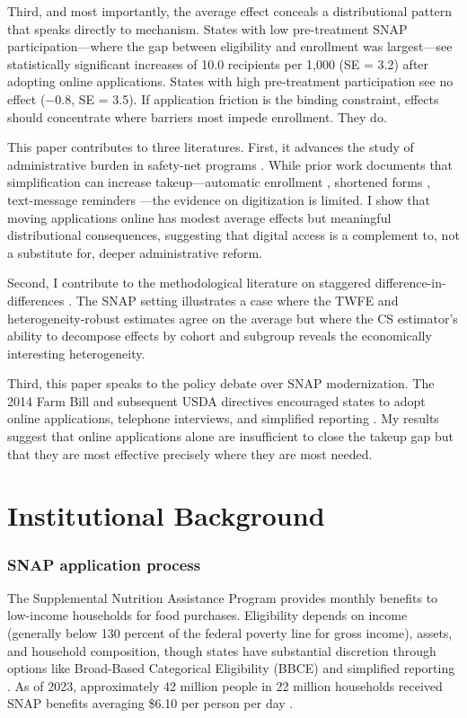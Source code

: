 \documentclass[12pt]{article}
\begin{document}
Third, and most importantly, the average effect conceals a distributional pattern that speaks directly to mechanism. States with low pre-treatment SNAP participation---where the gap between eligibility and enrollment was largest---see statistically significant increases of 10.0 recipients per 1,000 (SE = 3.2) after adopting online applications. States with high pre-treatment participation see no effect ($-0.8$, SE = 3.5). If application friction is the binding constraint, effects should concentrate where barriers most impede enrollment. They do.

This paper contributes to three literatures. First, it advances the study of administrative burden in safety-net programs \citep{herd2023, fox2022}. While prior work documents that simplification can increase takeup---automatic enrollment \citep{finkelstein2019}, shortened forms \citep{bhargava2015}, text-message reminders \citep{finkelstein2019}---the evidence on digitization is limited. I show that moving applications online has modest average effects but meaningful distributional consequences, suggesting that digital access is a complement to, not a substitute for, deeper administrative reform.

Second, I contribute to the methodological literature on staggered difference-in-differences \citep{callaway2021, sun2021, goodman2021, dechaisemartin2020, borusyak2024}. The SNAP setting illustrates a case where the TWFE and heterogeneity-robust estimates agree on the average but where the CS estimator's ability to decompose effects by cohort and subgroup reveals the economically interesting heterogeneity.

Third, this paper speaks to the policy debate over SNAP modernization. The 2014 Farm Bill and subsequent USDA directives encouraged states to adopt online applications, telephone interviews, and simplified reporting \citep{rosenbaum2019}. My results suggest that online applications alone are insufficient to close the takeup gap but that they are most effective precisely where they are most needed.

\section{Institutional Background}

\subsubsection*{SNAP application process} The Supplemental Nutrition Assistance Program provides monthly benefits to low-income households for food purchases. Eligibility depends on income (generally below 130 percent of the federal poverty line for gross income), assets, and household composition, though states have substantial discretion through options like Broad-Based Categorical Eligibility (BBCE) and simplified reporting \citep{usda2023}. As of 2023, approximately 42 million people in 22 million households received SNAP benefits averaging \$6.10 per person per day \citep{fns2023}.
\end{document}

